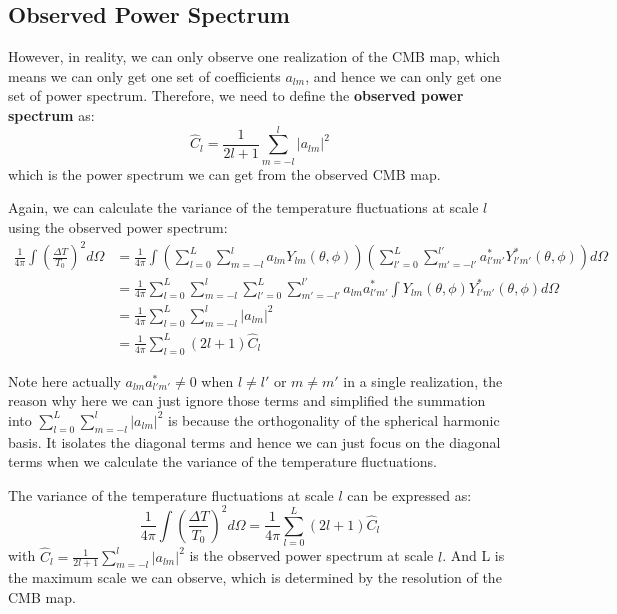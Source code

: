 \bigskip \noindent \bigskip \noindent \bigskip \noindent
\subsection{Observed Power Spectrum}
\begin{intuition}
    However, in reality, we can only observe one realization of the CMB map, which means we can only get one set of coefficients $a_{lm}$, and hence we can only get one set of power spectrum. Therefore, we need to define the \textbf{observed power spectrum} as:
    \[
        \hat{C}_l = \frac{1}{2l + 1} \sum_{m=-l}^{l} |a_{lm}|^2
    \]
    which is the power spectrum we can get from the observed CMB map. \\
\end{intuition}

\bigskip \noindent
\begin{foundation}
    Again, we can calculate the variance of the temperature fluctuations at scale $l$ using the observed power spectrum:
    \small
    \begin{align*}
        \frac{1}{4\pi} \int \left( \frac{\Delta T}{T_0} \right)^2 d\Omega &= \frac{1}{4\pi} \int \left( \sum_{l=0}^{L} \sum_{m=-l}^{l} a_{lm} Y_{lm}(\theta, \phi) \right) \left( \sum_{l'=0}^{L} \sum_{m'=-l'}^{l'} a_{l'm'}^* Y_{l'm'}^*(\theta, \phi) \right) d\Omega \\
        &= \frac{1}{4\pi} \sum_{l=0}^{L} \sum_{m=-l}^{l} \sum_{l'=0}^{L} \sum_{m'=-l'}^{l'} a_{lm} a_{l'm'}^* \int Y_{lm}(\theta, \phi) Y_{l'm'}^*(\theta, \phi) d\Omega \\
        &= \frac{1}{4\pi} \sum_{l=0}^{L} \sum_{m=-l}^{l} |a_{lm}|^2 \\
        &= \frac{1}{4\pi} \sum_{l=0}^{L} (2l + 1) \hat{C}_l
    \end{align*}
    \normalsize

    Note here actually $a_{lm} a_{l'm'}^* \neq 0$ when $l \neq l'$ or $m \neq m'$ in a single realization, the reason why here we can just ignore those terms and simplified the summation into $\sum_{l=0}^{L} \sum_{m=-l}^{l} |a_{lm}|^2$ is because the orthogonality of the spherical harmonic basis. It isolates the diagonal terms and hence we can just focus on the diagonal terms when we calculate the variance of the temperature fluctuations.
\end{foundation}

\bigskip \noindent
\begin{theory}
    The variance of the temperature fluctuations at scale $l$ can be expressed as:
    \[
        \frac{1}{4\pi} \int \left( \frac{\Delta T}{T_0} \right)^2 d\Omega = \frac{1}{4\pi} \sum_{l=0}^{L} (2l + 1) \hat{C}_l
    \]  
    with $\hat{C}_l = \frac{1}{2l + 1} \sum_{m=-l}^{l} |a_{lm}|^2$ is the observed power spectrum at scale $l$. And L is the maximum scale we can observe, which is determined by the resolution of the CMB map.
\end{theory}

